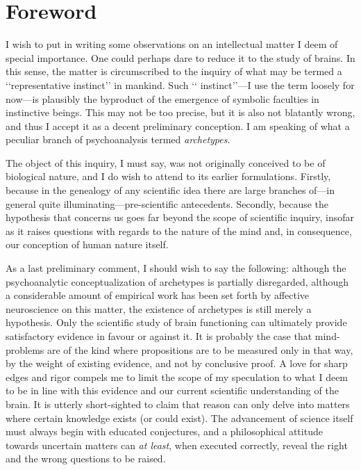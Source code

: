 \documentclass[a4paper]{article}
\begin{document}
    \section{Foreword}

    I wish to put in writing some observations on an intellectual matter I deem
    of special importance. One could perhaps dare to reduce it to the study of
    brains. In this sense, the matter is circumscribed to the inquiry of what may be
    termed a \lq\lq representative instinct\rq\rq{} in mankind. Such \lq\lq
    instinct\rq\rq{}---I use the term loosely for now---is plausibly the
    byproduct of the emergence of symbolic faculties in instinctive beings.
    This may not be too precise, but it is also not blatantly wrong, and thus I
    accept it as a decent preliminary conception. I am speaking of what a
    peculiar branch of psychoanalysis termed \textit{archetypes}.

    The object of this inquiry, I must say, was not originally conceived to be of
    biological nature, and I do wish to attend to its earlier formulations.
    Firstly, because in the genealogy of any scientific idea there are large
    branches of---in general quite illuminating---pre-scientific antecedents.
    Secondly, because the hypothesis that concerns us goes far beyond the scope of
    scientific inquiry, insofar as it raises questions with regards to
    the nature of the mind and, in consequence, our conception of human nature
    itself.

    As a last preliminary comment, I should wish to say the following: although
    the psychoanalytic conceptualization of archetypes is partially disregarded,
    although a considerable amount of empirical work has been set forth by
    affective neuroscience on this matter, the existence of archetypes is still
    merely a hypothesis. Only the scientific study of brain functioning can
    ultimately provide satisfactory evidence in favour or against it. It is
    probably the case that mind-problems are of the kind where propositions are
    to be measured only in that way, by the weight of existing evidence, and not
    by conclusive proof. A love for sharp edges and rigor compels me to limit
    the scope of my speculation to what I deem to be in line with this
    evidence and our current scientific understanding of the brain. It is
    utterly short-sighted to claim that reason can only delve into matters where
    certain knowledge exists (or could exist). The advancement of science itself
    must always begin with educated conjectures, and a philosophical attitude
    towards uncertain matters can \textit{at least}, when executed correctly,
    reveal the right and the wrong questions to be raised.
\end{document}
